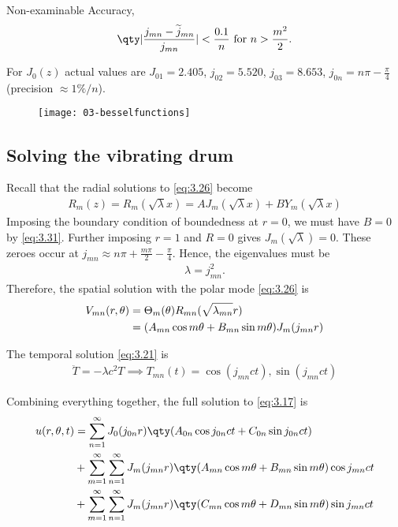 \begin{aside}{Non-examinable}
	Accuracy, 
	\begin{align} \label{eq:3.33}
		\qty| \frac{j_{mn} - \widetilde j_{mn}}{j_{mn}} | < \frac{0.1}{n} \text{ for } n > \frac{m^2}{2}.
	\end{align}
\end{aside} 

For $J_0(z)$ actual values are $J_{01} = 2.405$, $j_{02} = 5.520$, $j_{03} = 8.653$, $j_{0n} = n \pi - \frac{\pi}{4}$ (precision $\approx 1\%/n$).

\begin{figure}[h] 
    \centering 
    \texttt{[image: 03-besselfunctions]} 
\end{figure}

\subsection{Solving the vibrating drum}
Recall that the radial solutions to \cref{eq:3.26} become
\begin{align*}
	R_m(z) = R_m(\sqrt{\lambda} x) = A J_m(\sqrt{\lambda} x) + B Y_m(\sqrt{\lambda} x)
\end{align*}
Imposing the boundary condition of boundedness at $r = 0$, we must have $B = 0$ by \cref{eq:3.31}.
Further imposing $r = 1$ and $R = 0$ gives $J_m(\sqrt{\lambda}) = 0$.
These zeroes occur at $j_{mn} \approx n \pi + \frac{m \pi}{2} - \frac{\pi}{4}$.
Hence, the eigenvalues must be 
\begin{align} \label{eq:3.34}
	\lambda = j^2_{mn}.
\end{align}
Therefore, the spatial solution with the polar mode \cref{eq:3.26} is
\begin{align}
	V_{mn}(r, \theta) &= \Theta_m(\theta) R_{mn}(\sqrt{\lambda_{mn}} r) \notag \\
	&= (A_{mn} \cos m \theta + B_{mn} \sin m \theta) J_m (j_{mn} r) \label{eq:3.35}
\end{align}

The temporal solution \cref{eq:3.21} is
\begin{align*}
	\ddot T = -\lambda c^2 T \implies T_{mn}(t) = \cos(j_{mn} ct), \sin(j_{mn} ct)
\end{align*}

Combining everything together, the full solution to \cref{eq:3.17} is
\begin{align}
	\begin{aligned} \label{eq:3.36}
		u(r,\theta,t) & = \sum_{n=1}^\infty J_0(j_{0n} r) \qty( A_{0n}\cos j_{0n}ct + C_{0n}\sin j_{0n}ct ) \\
		&+ \sum_{m=1}^\infty \sum_{n=1}^\infty J_m (j_{mn}r) \qty( A_{mn} \cos m \theta + B_{mn} \sin m\theta ) \cos j_{mn} ct \\
		&+ \sum_{m=1}^\infty \sum_{n=1}^\infty J_m (j_{mn}r) \qty( C_{mn} \cos m \theta + D_{mn} \sin m\theta ) \sin j_{mn} ct
	\end{aligned}
\end{align} 

